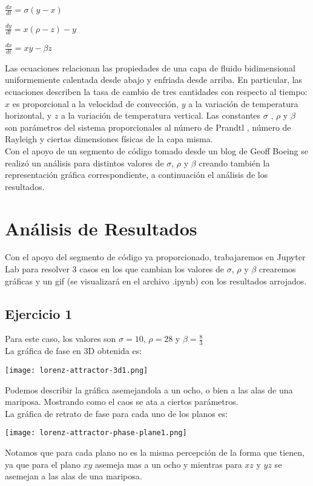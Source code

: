 \documentclass[12pt]{article}
\begin{document}
\centerline{$\displaystyle \frac{dx}{dt} = \sigma (y-x)$}
\centerline{$\displaystyle \frac{dy}{dt} = x (\rho-z)-y$}
\centerline{$\displaystyle \frac{dx}{dt} = xy-\beta z$}
$ $\\
Las ecuaciones relacionan las propiedades de una capa de fluido bidimensional uniformemente calentada desde abajo y enfriada desde arriba. En particular, las ecuaciones describen la tasa de cambio de tres cantidades con respecto al tiempo: $x$ es proporcional a la velocidad de convección, $y$ a la variación de temperatura horizontal, y  $z$ a la variación de temperatura vertical. Las constantes $\sigma$ , $\rho$ y $\beta$ son parámetros del sistema proporcionales al número de Prandtl , número de Rayleigh y ciertas dimensiones físicas de la capa misma.\\

Con el apoyo de un segmento de código tomado desde un blog de Geoff Boeing se realizó un análisis para distintos valores de $\sigma$, $\rho$ y $\beta$ creando también la representación gráfica correspondiente, a continuación el análisis de los resultados.

\section*{Análisis de Resultados}
Con el apoyo del segmento de código ya proporcionado, trabajaremos en Jupyter Lab para resolver 3 casos en los que cambian los valores de $\sigma$, $\rho$ y $\beta$ crearemos gráficas y un gif (se visualizará en el archivo .ipynb) con los resultados arrojados.

\subsection*{Ejercicio 1}
Para este caso, los valores son $\sigma= 10$, $\rho=28$ y $\beta=\frac{8}{3}$\\
La gráfica de fase en 3D obtenida es:
\begin{center}
    \texttt{[image: lorenz-attractor-3d1.png]}\\
\end{center}
Podemos describir la gráfica asemejandola a un ocho, o bien a las alas de una mariposa. Mostrando como el caos se ata a ciertos parámetros.\\

La gráfica de retrato de fase para cada uno de los planos es:
\begin{center}
    \texttt{[image: lorenz-attractor-phase-plane1.png]}\\
\end{center}
Notamos que para cada plano no es la misma percepción de la forma que tienen, ya que para el plano $xy$ asemeja mas a un ocho y mientras para $xz$ y $yz$ se asemejan a las alas de una mariposa.\\
\end{document}
